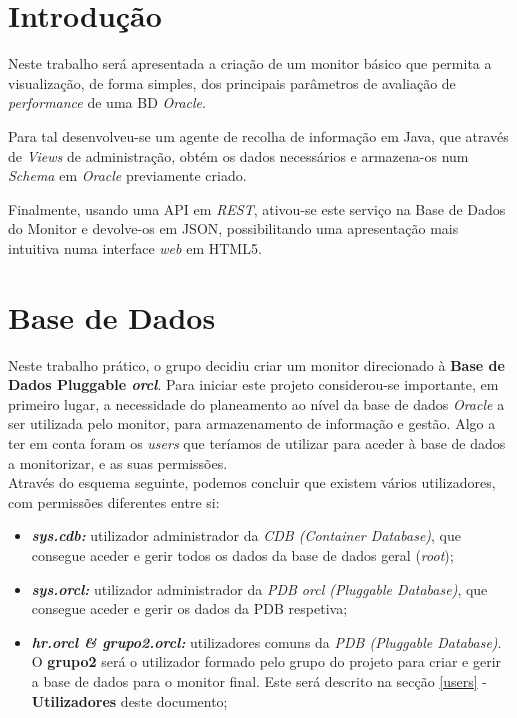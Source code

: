 \documentclass[a4paper]{article}
\begin{document}
\pagebreak
\tableofcontents
\newpage

\section{Introdução}
\hspace{3mm} 

Neste trabalho será apresentada a criação de um monitor básico que permita a visualização, de forma simples, dos principais parâmetros de avaliação de \emph{performance} de uma BD \emph{Oracle}.

Para tal desenvolveu-se um agente de recolha de informação em Java, que através de \emph{Views} de administração, obtém os dados necessários e armazena-os num \emph{Schema} em \emph{Oracle} previamente criado.

Finalmente, usando uma API em \emph{REST}, ativou-se este serviço na Base de Dados do Monitor e devolve-os em JSON, possibilitando uma apresentação mais intuitiva numa interface \emph{web} em HTML5.

\newpage


\section{Base de Dados}
\hspace{3mm} 

Neste trabalho prático, o grupo decidiu criar um monitor direcionado à \textbf{Base de Dados Pluggable \emph{orcl}}.
Para iniciar este projeto considerou-se importante, em primeiro lugar, a necessidade do planeamento ao nível da base de dados \emph{Oracle} a ser utilizada pelo monitor, para armazenamento de informação e gestão. Algo a ter em conta foram os \emph{users} que teríamos de utilizar para aceder à base de dados a monitorizar, e as suas permissões. \\

Através do esquema seguinte, podemos concluir que existem vários utilizadores, com permissões diferentes entre si:

\begin{itemize}
    \item \textit{\textbf{sys.cdb:}} utilizador administrador da \emph{CDB (Container Database)}, que consegue aceder e gerir todos os dados da base de dados geral (\emph{root}); 
    
    \item \textit{\textbf{sys.orcl:}} utilizador administrador da \emph{PDB orcl (Pluggable Database)}, que consegue aceder e gerir os dados da PDB respetiva; 
    
    \item \textit{\textbf{hr.orcl \& grupo2.orcl:}} utilizadores comuns da \emph{PDB (Pluggable Database)}. O \textbf{grupo2} será o utilizador formado pelo grupo do projeto para criar e gerir a base de dados para o monitor final. Este será descrito na secção \ref{users} - \textbf{Utilizadores} deste documento; 
\end{itemize}
\end{document}
